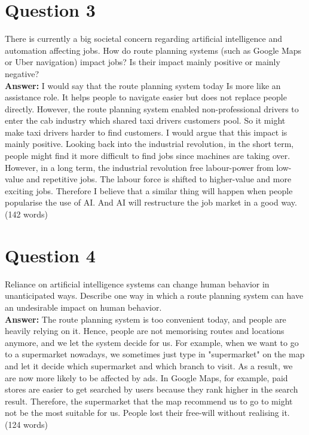 \documentclass[12pt]{extarticle}
\begin{document}
\newpage
\section*{Question 3}

There is currently a big societal concern regarding artificial intelligence and automation affecting jobs.  How do route planning systems (such as Google Maps or Uber navigation) impact jobs?  Is their impact mainly positive or mainly negative?\\

\noindent\textbf{Answer:} I would say that the route planning system today Is more like an assistance role. It helps people to navigate easier but does not replace people directly. However, the route planning system enabled non-professional drivers to enter the cab industry which shared taxi drivers customers pool. So it might make taxi drivers harder to find customers. I would argue that this impact is mainly positive. Looking back into the industrial revolution, in the short term, people might find it more difficult to find jobs since machines are taking over. However, in a long term, the industrial revolution free labour-power from low-value and repetitive jobs. The labour force is shifted to higher-value and more exciting jobs. Therefore I believe that a similar thing will happen when people popularise the use of AI. And AI will restructure the job market in a good way. (142 words)

\newpage
\section*{Question 4}

Reliance on artificial intelligence systems can change human behavior in unanticipated ways.  Describe one way in which a route planning system can have an undesirable impact on human behavior.\\

\noindent\textbf{Answer:} The route planning system is too convenient today, and people are heavily relying on it. Hence, people are not memorising routes and locations anymore, and we let the system decide for us. For example, when we want to go to a supermarket nowadays, we sometimes just type in "supermarket" on the map and let it decide which supermarket and which branch to visit. As a result, we are now more likely to be affected by ads. In Google Maps, for example, paid stores are easier to get searched by users because they rank higher in the search result. Therefore, the supermarket that the map recommend us to go to might not be the most suitable for us. People lost their free-will without realising it. (124 words)
\end{document}
